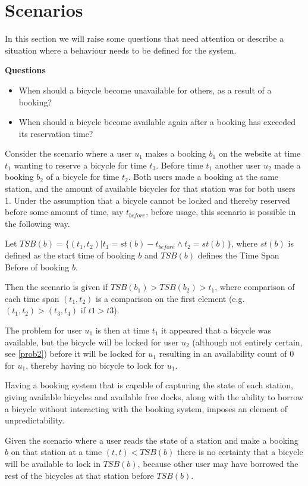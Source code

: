 \section{Scenarios}\label{sec:behaviourProblems}
In this section we will raise some questions that need attention or describe a situation where a behaviour needs to be defined for the system.

\textbf{Questions}
\begin{itemize}
\item When should a bicycle become unavailable for others, as a result of a booking?
\item When should a bicycle become available again after a booking has exceeded its reservation time?
\end{itemize}

\begin{description}[style=nextline]\label{prob1}
\item[Problem 1.1] Consider the scenario where a user $u_1$ makes a booking $b_1$ on the website at time $t_1$ wanting to reserve a bicycle for time $t_3$. Before time $t_1$ another user $u_2$ made a booking $b_2$ of a bicycle for time $t_2$. Both users made a booking at the same station, and the amount of available bicycles for that station was for both users 1. Under the assumption that a bicycle cannot be locked and thereby reserved before some amount of time, say $t_{before}$, before usage, this scenario is possible in the following way.

Let $TSB(b) = \{(t_1,t_2) | t_1 = st(b) - t_{before} \wedge t_2 = st(b) \}$, where $st(b)$ is defined as the start time of booking $b$ and $TSB(b)$ defines the Time Span Before of booking $b$.

Then the scenario is given if $TSB(b_1) > TSB(b_2) > t_1$, where comparison of each time span $(t_1, t_2)$ is a comparison on the first element (e.g. $(t_1, t_2) > (t_3, t_4)$ if $t1 > t3$).

The problem for user $u_1$ is then at time $t_1$ it appeared that a bicycle was available, but the bicycle will be locked for user $u_2$ (although not entirely certain, see \ref{prob2}) before it will be locked for $u_1$ resulting in an availability count of 0 for $u_1$, thereby having no bicycle to lock for $u_1$.
\end{description}

\begin{description}\label{prob2}
	\item[Problem 1.2] Having a booking system that is capable of capturing the state of each station, giving available bicycles and available free docks, along with the ability to borrow a bicycle without interacting with the booking system, imposes an element of unpredictability.
	
	Given the scenario where a user reads the state of a station and make a booking $b$ on that station at a time $(t,t) < TSB(b)$ there is no certainty that a bicycle will be available to lock in $TSB(b)$, because other user may have borrowed the rest of the bicycles at that station before $TSB(b)$.
\end{description}

